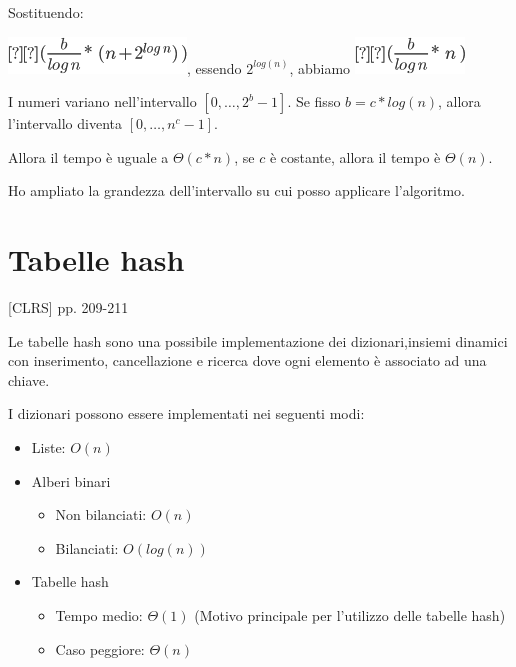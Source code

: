 \documentclass{article}
\providecommand{\tightlist}{%
  \setlength{\itemsep}{0pt}\setlength{\parskip}{0pt}}
\begin{document}
{Sostituendo:}

\includegraphics{images/image212.png}{, essendo $2^{log(n)}$, abbiamo }\includegraphics{images/image214.png}

{I numeri variano nell'intervallo $[0,\ldots,2^b-1]$. Se fisso $b=c*log(n)$, allora l'intervallo diventa $[0,\ldots,n^c-1]$.}

{Allora il tempo è uguale a $\Theta(c*n)$, se $c$ è costante, allora il tempo è $\Theta(n)$.}

{Ho ampliato la grandezza dell'intervallo su cui posso applicare l'algoritmo.}

\section{Tabelle hash}

{{[}CLRS{]} pp. 209-211}

{Le tabelle hash sono una possibile implementazione dei dizionari,insiemi dinamici con inserimento, cancellazione e ricerca dove ogni elemento è associato ad una chiave.}

{I dizionari possono essere implementati nei seguenti modi:}

\begin{itemize}
\tightlist
\item
  {Liste: $O(n)$}
\item
	{Alberi binari}
	
\begin{itemize}
\tightlist
\item
  	{Non bilanciati: $O(n)$}
\item
  	{Bilanciati: $O(log(n))$}
\end{itemize}

\item
  	{Tabelle hash}
  	
\begin{itemize}
\tightlist
\item
	{Tempo medio: $\Theta(1)$ (Motivo principale per l'utilizzo delle tabelle hash)}
\item
	{Caso peggiore: $\Theta(n)$}
\end{itemize}

\end{itemize}
\end{document}
